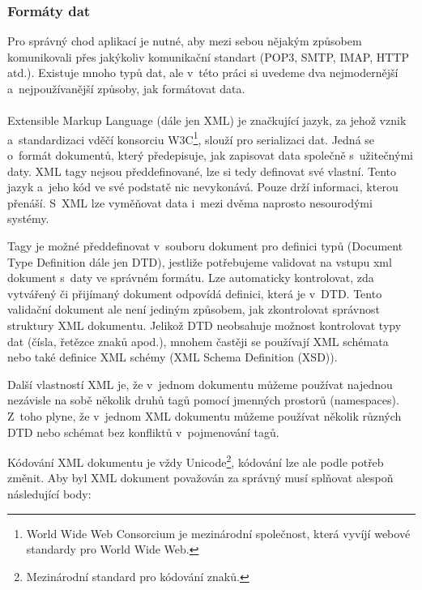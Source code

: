 \subsubsection{Formáty dat}
Pro správný chod aplikací je nutné, aby mezi sebou nějakým způsobem komunikovali přes jakýkoliv komunikační standart (POP3, SMTP, IMAP, HTTP atd.). Existuje mnoho typů dat, ale v~této práci si uvedeme dva nejmodernější a~nejpoužívanější způsoby, jak formátovat data. \\

 \\
Extensible Markup Language (dále jen XML) je značkující jazyk, za jehož vznik a~standardizaci vděčí konsorciu W3C\footnote{World Wide Web Consorcium je mezinárodní společnost, která vyvíjí webové standardy pro World Wide Web.}, slouží pro serializaci dat. Jedná se o~formát dokumentů, který předepisuje, jak zapisovat data společně s~užitečnými daty. XML tagy nejsou předdefinované, lze si tedy definovat své vlastní. Tento jazyk a~jeho kód ve své podstatě nic nevykonává. Pouze drží informaci, kterou přenáší. S~XML lze vyměňovat data i~mezi dvěma naprosto nesourodými systémy.

Tagy je možné předdefinovat v~souboru dokument pro definici typů (Document Type Definition dále jen DTD), jestliže potřebujeme validovat na vstupu xml dokument s~daty ve správném formátu. Lze automaticky kontrolovat, zda vytvářený či přijímaný dokument odpovídá definici, která je v~DTD. Tento validační dokument ale není jediným způsobem, jak zkontrolovat správnost struktury XML dokumentu. Jelikož DTD neobsahuje možnost kontrolovat typy dat (čísla, řetězce znaků apod.), mnohem častěji se používají XML schémata nebo také definice XML schémy (XML Schema Definition (XSD)). 

Další vlastností XML je, že v~jednom dokumentu můžeme používat najednou nezávisle na sobě několik druhů tagů pomocí jmenných prostorů (namespaces). Z~toho plyne, že v~jednom XML dokumentu můžeme používat několik různých DTD nebo schémat bez konfliktů v~pojmenování tagů.\cite{7, 8}

Kódování XML dokumentu je vždy Unicode\footnote{Mezinárodní standard pro kódování znaků.}, kódování lze ale podle potřeb změnit. Aby byl XML dokument považován za správný musí splňovat alespoň následující body:

